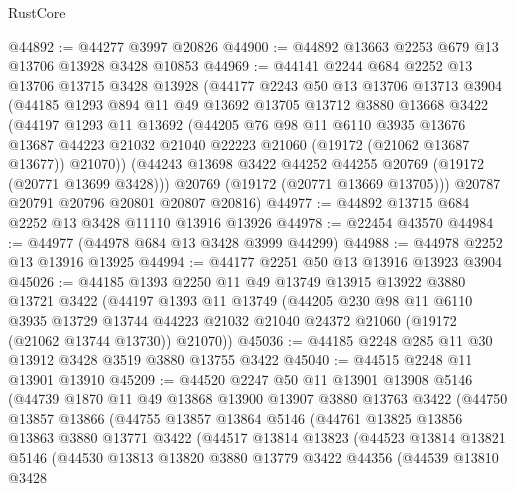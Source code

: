 \begin{lexlean}{RustCore}
\begin{coremodule}
@44892 := @44277 @3997 @20826
@44900 := @44892 @13663 @2253 @679 @13 @13706 @13928 @3428 @10853
@44969 := @44141
    @2244
    @684
    @2252
    @13
    @13706
    @13715
    @3428
    @13928
    (@44177
      @2243
      @50
      @13
      @13706
      @13713
      @3904
      (@44185
        @1293
        @894
        @11
        @49
        @13692
        @13705
        @13712
        @3880
        @13668
        @3422
        (@44197
          @1293
          @11
          @13692
          (@44205
            @76
            @98
            @11
            @6110
            @3935
            @13676
            @13687
            @44223
            @21032
            @21040
            @22223
            @21060
            (@19172 (@21062 @13687 @13677))
            @21070))
        (@44243 @13698 @3422 @44252 @44255 @20769 (@19172 (@20771 @13699 @3428)))
        @20769
        (@19172 (@20771 @13669 @13705)))
      @20787
      @20791
      @20796
      @20801
      @20807
      @20816)
@44977 := @44892 @13715 @684 @2252 @13 @3428 @11110 @13916 @13926
@44978 := @22454 @43570
@44984 := @44977 (@44978 @684 @13 @3428 @3999 @44299)
@44988 := @44978 @2252 @13 @13916 @13925
@44994 := @44177 @2251 @50 @13 @13916 @13923 @3904
@45026 := @44185
    @1393
    @2250
    @11
    @49
    @13749
    @13915
    @13922
    @3880
    @13721
    @3422
    (@44197
      @1393
      @11
      @13749
      (@44205
        @230
        @98
        @11
        @6110
        @3935
        @13729
        @13744
        @44223
        @21032
        @21040
        @24372
        @21060
        (@19172 (@21062 @13744 @13730))
        @21070))
@45036 := @44185 @2248 @285 @11 @30 @13912 @3428 @3519 @3880 @13755 @3422
@45040 := @44515 @2248 @11 @13901 @13910
@45209 := @44520
    @2247
    @50
    @11
    @13901
    @13908
    @5146
    (@44739
      @1870
      @11
      @49
      @13868
      @13900
      @13907
      @3880
      @13763
      @3422
      (@44750
        @13857
        @13866
        (@44755
          @13857
          @13864
          @5146
          (@44761
            @13825
            @13856
            @13863
            @3880
            @13771
            @3422
            (@44517
              @13814
              @13823
              (@44523
                @13814
                @13821
                @5146
                (@44530
                  @13813
                  @13820
                  @3880
                  @13779
                  @3422
                  @44356
                  (@44539
                    @13810
                    @3428

\end{coremodule}
\end{lexlean}
